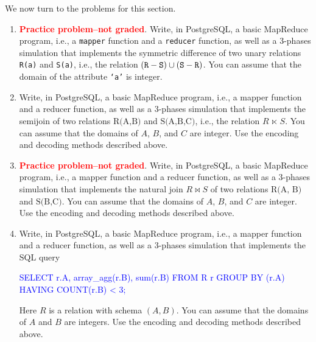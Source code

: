 \documentclass{article}
\renewenvironment{alltt}{\vspace{-0.75\baselineskip}\begin{oldalltt}}{\end{oldalltt}\vspace{+0.50\baselineskip}}
\begin{document}
We now turn to the problems for this section.

\begin{enumerate}[resume]
\item \textcolor{red}{\bf Practice problem--not graded}. Write, in PostgreSQL, a basic MapReduce program, i.e., a {\tt mapper}
function and a {\tt reducer} function, as well as a 3-phases simulation that
implements the symmetric difference of two unary relations {\tt R(a)} and
{\tt S(a)}, i.e., the relation $({\tt R} - {\tt S})\cup({\tt S}-{\tt R})$.  You can assume that the domain of
the attribute {\tt `a'} is integer.

\item  Write, in PostgreSQL, a basic MapReduce program, i.e., a mapper function and a reducer function, as well as a 3-phases simulation 
that implements the semijoin of two
relations $\text{R(A,B)}$ and $\text{S(A,B,C)}$, i.e., the relation $R\,\ltimes\, S$.
You can assume that the domains of $A$, $B$, and $C$ are integer.
Use the encoding and decoding methods described above.

\item\label{join} \textcolor{red}{\bf Practice problem--not graded}. 
 Write, in PostgreSQL, a basic MapReduce program, i.e., a mapper function and a reducer function, as well as a 3-phases simulation 
that implements the natural join $R \bowtie S$ of two relations $\text{R(A, B)}$ and $\text{S(B,C)}$.
You can assume that the domains of $A$, $B$, and $C$ are integer.
Use the encoding and decoding methods described above.

\item  Write, in PostgreSQL, a basic MapReduce program, i.e., a mapper function and a reducer function, as well as a 3-phases simulation 
that implements the SQL query
\begin{alltt}\textcolor{blue}{
SELECT r.A, array_agg(r.B), sum(r.B)
FROM   R r
GROUP  BY (r.A)
HAVING COUNT(r.B) < 3;
}\end{alltt}
Here $R$ is a relation with schema $(A,B)$.   You can assume that the domains of $A$ and $B$ are integers.
Use the encoding and decoding methods described above.
\end{enumerate}
\end{document}
